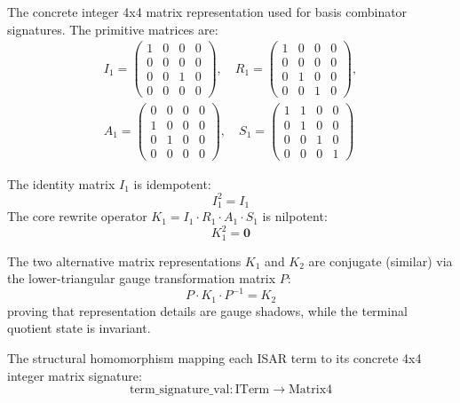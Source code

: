 \begin{definition}
The concrete integer 4x4 matrix representation used for basis combinator signatures. The primitive matrices are:
\begin{gather*}
I_1 = \begin{pmatrix} 1 & 0 & 0 & 0 \\ 0 & 0 & 0 & 0 \\ 0 & 0 & 1 & 0 \\ 0 & 0 & 0 & 0 \end{pmatrix}, \quad
R_1 = \begin{pmatrix} 1 & 0 & 0 & 0 \\ 0 & 0 & 0 & 0 \\ 0 & 1 & 0 & 0 \\ 0 & 0 & 1 & 0 \end{pmatrix}, \\
A_1 = \begin{pmatrix} 0 & 0 & 0 & 0 \\ 1 & 0 & 0 & 0 \\ 0 & 1 & 0 & 0 \\ 0 & 0 & 0 & 0 \end{pmatrix}, \quad
S_1 = \begin{pmatrix} 1 & 1 & 0 & 0 \\ 0 & 1 & 0 & 0 \\ 0 & 0 & 1 & 0 \\ 0 & 0 & 0 & 1 \end{pmatrix}
\end{gather*}
\end{definition}

\begin{theorem}
The identity matrix $I_1$ is idempotent:
$$I_1^2 = I_1$$
The core rewrite operator $K_1 = I_1 \cdot R_1 \cdot A_1 \cdot S_1$ is nilpotent:
$$K_1^2 = \mathbf{0}$$
\end{theorem}

\begin{theorem}
The two alternative matrix representations $K_1$ and $K_2$ are conjugate (similar) via the lower-triangular gauge transformation matrix $P$:
$$P \cdot K_1 \cdot P^{-1} = K_2$$
proving that representation details are gauge shadows, while the terminal quotient state is invariant.
\end{theorem}

\begin{definition}
The structural homomorphism mapping each ISAR term to its concrete 4x4 integer matrix signature:
$$\text{term\_signature\_val} : \text{ITerm} \to \text{Matrix4}$$
\end{definition}

